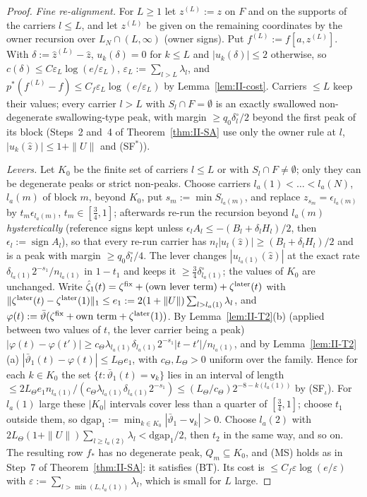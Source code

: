 \documentclass[10pt]{amsart}
\theoremstyle{definition}
\theoremstyle{remark}
\newcommand{\sgn}{\operatorname{sign}}
\newcommand{\zh}{\hat z}
\begin{document}
\begin{proof}
\emph{Fine re-alignment.}  For $L\ge1$ let $z^{(L)}:=z$ on $F$ and on the
supports of the carriers $l\le L$, and let $z^{(L)}$ be given on the remaining
coordinates by the owner recursion over $L_N\cap(L,\infty)$ (owner signs).  Put
$f^{(L)}:=f[a,z^{(L)}]$.  With $\delta:=\zh^{(L)}-\zh$, $u_k(\delta)=0$ for $k\le L$ and
$|u_k(\delta)|\le2$ otherwise, so $c(\delta)\le C\varepsilon_L\log(e/\varepsilon_L)$,
$\varepsilon_L:=\sum_{l>L}\lambda_l$, and $p^*(f^{(L)}-f)\le C_f\varepsilon_L\log(e/
\varepsilon_L)$ by Lemma~\ref{lem:II-cost}.  Carriers $\le L$ keep their values;
every carrier $l>L$ with $S_l\cap F=\emptyset$ is an exactly swallowed
non-degenerate swallowing-type peak, with margin $\ge q_0\delta^\circ_l/2$ beyond
the first peak of its block (Steps~2 and~4 of Theorem~\ref{thm:II-SA} use only
the owner rule at $l$, $|u_k(\zh)|\le1+\|U\|$ and (SF$^*$)).

\emph{Levers.}  Let $K_0$ be the finite set of carriers $l\le L$ or with $S_l\cap
F\ne\emptyset$; only they can be degenerate peaks or strict non-peaks.  Choose
carriers $l_a(1)<\dots<l_a(N)$, $l_a(m)$ of block $m$, beyond $K_0$, put $s_m:=
\min S_{l_a(m)}$, and replace $z_{s_m}=\epsilon_{l_a(m)}$ by $t_m\epsilon_{l_a(m)}$,
$t_m\in[\frac34,1]$; afterwards re-run the recursion beyond $l_a(m)$
\emph{hysteretically} (reference signs kept unless $\epsilon_lA_l\le-(B_l+\delta_lH_l)/
2$, then $\epsilon_l:=\sgn A_l$), so that every re-run carrier has $n_l|u_l(\zh)|\ge
(B_l+\delta_lH_l)/2$ and is a peak with margin $\ge q_0\delta^\circ_l/4$.  The lever
changes $|u_{l_a(1)}(\zh)|$ at the exact rate $\delta_{l_a(1)}2^{-s_1}/n_{l_a(1)}$ in
$1-t_1$ and keeps it $\ge\frac34\delta^\circ_{l_a(1)}$; the values of $K_0$ are
unchanged.  Write $\hat\zeta_1(t)=\zeta^{\rm fix}+(\text{own lever term})+\zeta^{\rm
later}(t)$ with $\|\zeta^{\rm later}(t)-\zeta^{\rm later}(1)\|_1\le e_1:=2(1+\|U\|)\sum_{l>
l_a(1)}\lambda_l$, and $\varphi(t):=\bar\vartheta(\zeta^{\rm fix}+\text{own term}+\zeta^{\rm
later}(1))$.  By Lemma~\ref{lem:II-T2}(b) (applied between two values of $t$,
the lever carrier being a peak) $|\varphi(t)-\varphi(t')|\ge c_\Theta\lambda_{l_a(1)}
\delta_{l_a(1)}2^{-s_1}|t-t'|/n_{l_a(1)}$, and by Lemma~\ref{lem:II-T2}(a)
$|\bar\vartheta_1(t)-\varphi(t)|\le L_\Theta e_1$, with $c_\Theta,L_\Theta>0$ uniform over the
family.  Hence for each $k\in K_0$ the set $\{t:\bar\vartheta_1(t)=\mathsf v_k\}$ lies in
an interval of length $\le2L_\Theta e_1n_{l_a(1)}/(c_\Theta\lambda_{l_a(1)}\delta_{l_a(1)}
2^{-s_1})\le(L_\Theta/c_\Theta)2^{-8-k(l_a(1))}$ by (SF$_\iota$).  For $l_a(1)$ large
these $|K_0|$ intervals cover less than a quarter of $[\frac34,1]$; choose $t_1$
outside them, so $\mathrm{dgap}_1:=\min_{k\in K_0}|\bar\vartheta_1-\mathsf v_k|>0$.  Choose
$l_a(2)$ with $2L_\Theta(1+\|U\|)\sum_{l\ge l_a(2)}\lambda_l<\mathrm{dgap}_1/2$, then $t_2$
in the same way, and so on.  The resulting row $f_*$ has no degenerate peak,
$Q_m\subseteq K_0$, and (MS) holds as in Step~7 of Theorem~\ref{thm:II-SA}: it
satisfies (BT).  Its cost is $\le C_f\varepsilon\log(e/\varepsilon)$ with $\varepsilon:=
\sum_{l>\min(L,l_a(1))}\lambda_l$, which is small for $L$ large.
\end{proof}
\end{document}
